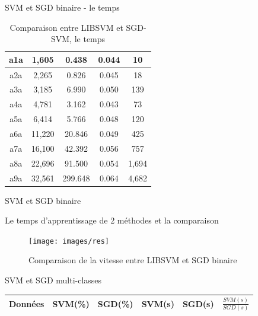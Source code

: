 \documentclass[11pt]{beamer}
\begin{document}
\begin{otherlanguage}{french}
\begin{frame}{SVM et SGD binaire - le temps}
\begin{table}
\begin{center}
\begin{tabular}{ | c | c | c | c | c |}
    a1a & 1,605 & 0.438 & 0.044 & 10 \\ \hline
    
    a2a & 2,265 & 0.826 & 0.045 & 18 \\ \hline
    
    a3a & 3,185 & 6.990 & 0.050 & 139 \\ \hline
    
    a4a & 4,781 & 3.162 & 0.043 & 73 \\ \hline
    
    a5a & 6,414 & 5.766 & 0.048 & 120 \\ \hline
    
    a6a & 11,220 & 20.846 & 0.049 & 425 \\ \hline
    
    a7a & 16,100 & 42.392 & 0.056 & 757 \\ \hline
    
    a8a & 22,696 & 91.500 & 0.054 & 1,694 \\ \hline
    
    a9a & 32,561 & 299.648 & 0.064 & 4,682 \\ \hline
    
    \end{tabular}
\end{center}
\caption{Comparaison entre LIBSVM et SGD-SVM, le temps}
\label{tab:svmsgdtime}
\end{table}

\end{frame}

\begin{frame}{SVM et SGD binaire}

Le temps d'apprentissage de 2 méthodes et la comparaison

\begin{figure}[ht!]
\centering
\texttt{[image: images/res]}
\caption{Comparaison de la vitesse entre LIBSVM et SGD binaire}
\label{fig:res}
\end{figure}

\end{frame}


\begin{frame}{SVM et SGD multi-classes}

\begin{table}
\begin{center}
    \begin{tabular}{ | c | c | c | c | c | c |}
    \hline
    Données & SVM(\%) & SGD(\%) & SVM(s) & SGD(s) & $\frac{SVM(s)}{SGD(s)}$ \\ \hline
    

\end{tabular}
\end{center}
\end{table}
\end{frame}
\end{otherlanguage}
\end{document}
